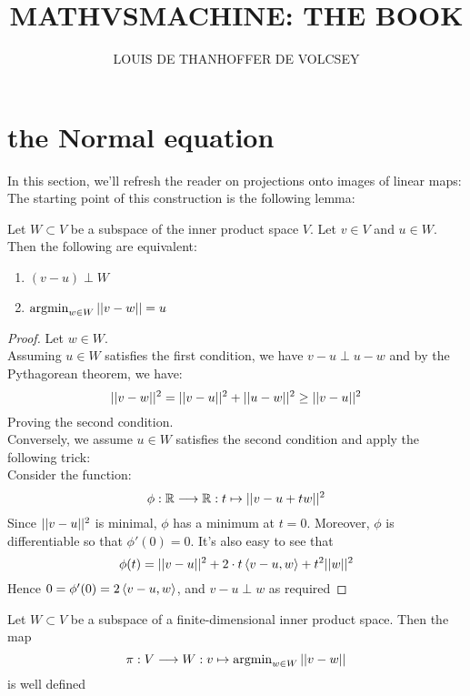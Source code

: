 


\title{\textbf{MATHVSMACHINE: THE BOOK}}
\author{LOUIS DE THANHOFFER DE VOLCSEY}
\date{}
\maketitle	


\noindent\hrulefill
\tableofcontents{}
\noindent\hrulefill

\section{the Normal equation}


\noindent In this section, we'll refresh the reader on projections onto images of linear maps: The starting point of this construction is the following lemma:
\begin{lemma}\label{lem:mindist-perp}
	Let $W\subset V$ be a subspace of the inner product space $V$. Let $v \in V$ and $u \in W$.\\
	Then the  following are equivalent:
	\begin{enumerate}
		\item $(v-u) \perp W$
		\item $	\operatorname{argmin}_{w \in W}\vert \vert v-w \vert \vert =u$	
	\end{enumerate}
\end{lemma}

\begin{proof}
	Let $w \in W$.\\
	Assuming $u \in W$ satisfies the first condition, we have $v-u \perp u-w$ and by the Pythagorean theorem, we have:
	\[
	\vert \vert v-w \vert \vert^2 = \vert \vert v-u \vert \vert^2+\vert \vert u-w \vert \vert^2 \ge \vert \vert v-u \vert \vert^2
	\]
	Proving the second condition.\\ 
	Conversely, we assume $u\in W$ satisfies the second condition and apply the following trick:\\
	Consider the function:
	\[
	\phi:\mathbb{R}\longrightarrow \mathbb{R}: t \mapsto \vert \vert v-u+tw \vert \vert^2
	\]	
	Since $\vert \vert v-u \vert \vert^2$ is minimal, $\phi$ has a minimum at $t=0$. Moreover, $\phi$ is differentiable so that $\phi'(0)=0$. It's also easy to see that
	\[
	\phi(t) = \vert \vert v-u \vert \vert^2 +2\cdot t \left\langle v-u,w\right\rangle+t^2\vert \vert w \vert \vert^2
	\]
	Hence $0=\phi'(0) = 2 \left\langle v-u,w\right\rangle$, and $v-u\perp w$ as required
\end{proof}

\begin{lemma}\label{lem:projection}
	Let $W \subset V$ be a  subspace of a finite-dimensional inner product space. Then the map
	\[
	\pi: V\longrightarrow W: v \mapsto \operatorname{argmin}_{w \in W} \vert \vert v- w \vert \vert
	\]
	is well defined
\end{lemma}

